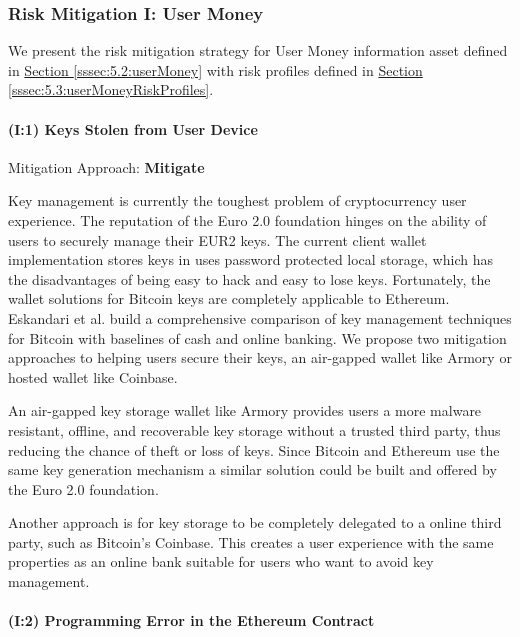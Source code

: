 \documentclass[12pt]{article} %
\newcommand{\hypersectionref}[1]{\hyperref[#1]{Section \ref{#1}}}
\begin{document}
{\subsubsection{Risk Mitigation I: User Money} \label{sssec:5.4:riskMitigationUserMoney}

We present the risk mitigation strategy for User Money information asset defined in \hypersectionref{sssec:5.2:userMoney} with risk profiles defined in \hypersectionref{sssec:5.3:userMoneyRiskProfiles}.

\paragraph{(I:1) Keys Stolen from User Device}

Mitigation Approach: \textbf{Mitigate}

Key management is currently the toughest problem of cryptocurrency user experience. The reputation of the Euro 2.0 foundation hinges on the ability of users to securely manage their EUR2 keys. The current client wallet implementation stores keys in uses password protected local storage, which has the disadvantages of being easy to hack and easy to lose keys. Fortunately, the wallet solutions for Bitcoin keys are completely applicable to Ethereum. Eskandari et al. build a comprehensive comparison of key management techniques for Bitcoin with baselines of cash and online banking\cite{Eskandari2015}. We propose two mitigation approaches to helping users secure their keys, an air-gapped wallet like Armory or hosted wallet like Coinbase.

An air-gapped key storage wallet like Armory\cite{bitcoinArmory} provides users a more malware resistant, offline, and recoverable key storage without a trusted third party, thus reducing the chance of theft or loss of keys. Since Bitcoin and Ethereum use the same key generation mechanism a similar solution could be built and offered by the Euro 2.0 foundation.

Another approach is for key storage to be completely delegated to a online third party, such as Bitcoin's Coinbase. This creates a user experience with the same properties as an online bank\cite{Eskandari2015} suitable for users who want to avoid key management.

\paragraph{(I:2) Programming Error in the Ethereum Contract}

}
\end{document}
